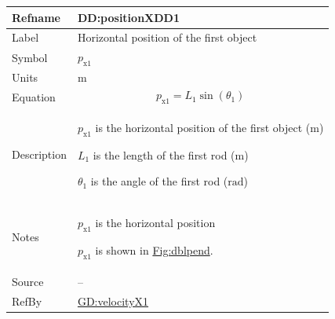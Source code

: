 \documentclass[12pt]{article}
\begin{document}
\vspace{\baselineskip}
\noindent
\begin{minipage}{\textwidth}
\begin{tabular}{>{\raggedright}p{}>{\raggedright\arraybackslash}p{}}
\toprule \textbf{Refname} & \textbf{DD:positionXDD1}
\label{DD:positionXDD1}
\\ \midrule
Label & Horizontal position of the first object
        
\\ \midrule
Symbol & ${p_{\text{x}1}}$
         
\\ \midrule
Units & ${\text{m}}$
        
\\ \midrule
Equation & \begin{displaymath}
           {p_{\text{x}1}}={L_{1}} \sin\left({θ_{1}}\right)
           \end{displaymath}
\\ \midrule
Description & \begin{symbDescription}
              \item{${p_{\text{x}1}}$ is the horizontal position of the first object (${\text{m}}$)}
              \item{${L_{1}}$ is the length of the first rod (${\text{m}}$)}
              \item{${θ_{1}}$ is the angle of the first rod (${\text{rad}}$)}
              \end{symbDescription}
\\ \midrule
Notes & ${p_{\text{x}1}}$ is the horizontal position
        
        ${p_{\text{x}1}}$ is shown in \hyperref[Figure:dblpend]{Fig:dblpend}.
        
\\ \midrule
Source & --
         
\\ \midrule
RefBy & \hyperref[GD:velocityX1]{GD:velocityX1}
        
\\ \bottomrule
\end{tabular}
\end{minipage}
\end{document}
